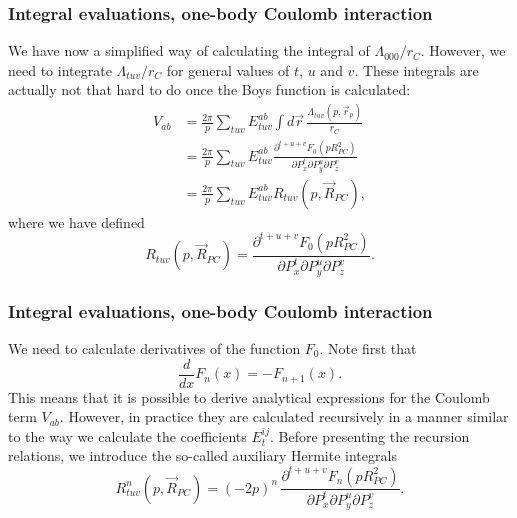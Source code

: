 \frame
{
  \frametitle{Integral evaluations, one-body Coulomb interaction}
\begin{small}
{\scriptsize
We have now a  simplified way of calculating the integral of $\Lambda_{000}/r_C$. However, we need to integrate $\Lambda_{tuv}/r_C$ for general values of $t$, $u$ and $v$.
These integrals are actually not that hard to do once the Boys function is calculated:
\begin{align}
 V_{ab} & = \frac{2\pi}{p}\sum_{tuv}E^{ab}_{tuv}\int d\vec r \, \frac{\Lambda_{tuv}(p,\vec r_p)}{r_C} \\
        & = \frac{2\pi}{p}\sum_{tuv}E^{ab}_{tuv} \frac{\partial^{t+u+v} F_0(p R^2_{PC})}{\partial P_x^t \partial P_y^u \partial P_z^v} \\
        & = \frac{2\pi}{p}\sum_{tuv}E^{ab}_{tuv} R_{tuv}(p,\vec R_{PC}), \label{eq:V_ab}
\end{align}
where we have defined
\begin{equation}
 R_{tuv}(p,\vec R_{PC}) = \frac{\partial^{t+u+v} F_0(p R^2_{PC})}{\partial P_x^t \partial P_y^u \partial P_z^v}.
\end{equation}
}
\end{small}
}


\frame
{
  \frametitle{Integral evaluations, one-body Coulomb interaction}
\begin{small}
{\scriptsize
We need to calculate derivatives of the function $F_0$. Note first that
\begin{equation}
 \frac{d}{dx}F_n(x) = -F_{n+1}(x).
\end{equation}
This means that it is possible to derive analytical expressions for the Coulomb term $V_{ab}$. However, in practice they are calculated recursively in a manner similar to the way we calculate
the coefficients $E^{ij}_t$. Before presenting the recursion relations, we introduce the so-called auxiliary Hermite integrals
\begin{equation}
 R^n_{tuv}(p,\vec R_{PC}) = (-2p)^n\,\frac{\partial^{t+u+v} F_n(p R^2_{PC})}{\partial P_x^t \partial P_y^u \partial P_z^v}.
\end{equation}
}
\end{small}
}




